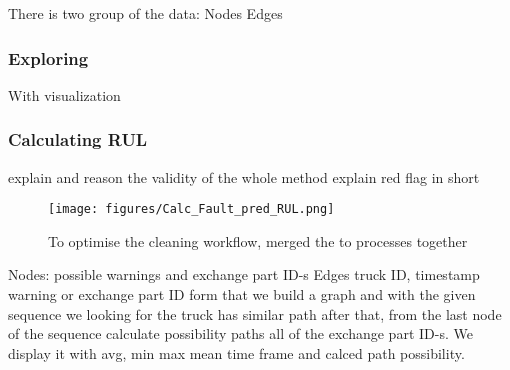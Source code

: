 		There is two group of the data:
		Nodes
		Edges

		\subsubsection{Exploring}
		With visualization
		\subsubsection{Calculating RUL}
explain and reason the validity of the whole method
		explain red flag in short
		\begin{figure}[!ht]
		\centering
		\texttt{[image: figures/Calc\_Fault\_pred\_RUL.png]}
		\caption{To optimise the cleaning workflow, merged the to processes together} 
		\end{figure}
		Nodes: possible warnings and exchange part ID-s
		Edges truck ID, timestamp warning or exchange part ID
		form that we build a graph and with the given sequence we looking for the truck has similar path after that, from the last node of the sequence calculate possibility paths all of the exchange part ID-s. We display it with avg, min max mean time frame and calced path possibility.